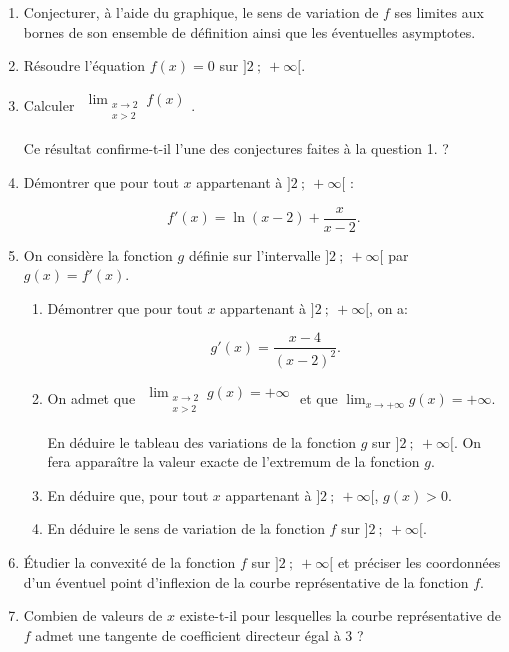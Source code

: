 \begin{enumerate}
\item Conjecturer, à l'aide du graphique, le sens de variation de $f$ ses limites aux bornes
de son ensemble de définition ainsi que les éventuelles asymptotes.
\item Résoudre l'équation $f(x) = 0$ sur $]2~;~+\infty[$.
\item Calculer $\begin{gathered}\displaystyle\lim_{\substack{x \to 2\\x > 2}} f(x)\end{gathered}$.

Ce résultat confirme-t-il l'une des conjectures faites à la question 1. ?
\item Démontrer que pour tout $x$ appartenant à $]2~;~+\infty[$ :

\[f'(x) = \ln (x - 2) + \dfrac{x}{x - 2}.\]
\item On considère la fonction $g$ définie sur l'intervalle $]2~;~+\infty[$ par $g(x) = f'(x)$.
	\begin{enumerate}
		\item Démontrer que pour tout $x$ appartenant à $]2~;~+\infty[$, on a:

\[g'(x) = \dfrac{x - 4}{(x - 2)^2}.\]

		\item On admet que $\begin{gathered}\displaystyle\lim_{\substack{x \to 2\\x>2}} g(x) = + \infty\end{gathered}$ et que $\displaystyle\lim_{x \to + \infty} g(x) = +\infty$.

En déduire le tableau des variations de la fonction $g$ sur $]2~;~+\infty[$. On fera apparaître la valeur exacte de l'extremum de la fonction $g$.
		\item En déduire que, pour tout $x$ appartenant à $]2~;~+\infty[$,\: $g(x) > 0$.
		\item En déduire le sens de variation de la fonction $f$ sur $]2~;~+\infty[$.
	\end{enumerate}
\item Étudier la convexité de la fonction $f$ sur $]2~;~+\infty[$ et préciser les coordonnées d'un éventuel point d'inflexion de la courbe représentative de la fonction $f$.
\item Combien de valeurs de $x$ existe-t-il pour lesquelles la courbe représentative de $f$
admet une tangente de coefficient directeur égal à $3$ ?
\end{enumerate}

\bigskip
